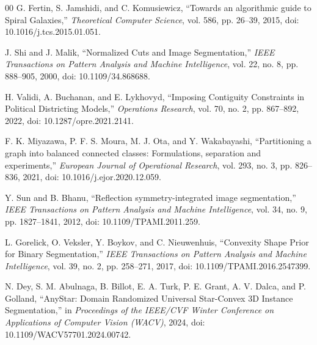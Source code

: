 \documentclass[conference]{IEEEtran}
\begin{document}
\begin{thebibliography}{00}
G. Fertin, S. Jamshidi, and C. Komusiewicz, ``Towards an algorithmic guide to Spiral Galaxies,'' \emph{Theoretical Computer Science}, vol. 586, pp. 26--39, 2015, doi: 10.1016/j.tcs.2015.01.051.

J. Shi and J. Malik, ``Normalized Cuts and Image Segmentation,'' \emph{IEEE Transactions on Pattern Analysis and Machine Intelligence}, vol. 22, no. 8, pp. 888--905, 2000, doi: 10.1109/34.868688.

H. Validi, A. Buchanan, and E. Lykhovyd, ``Imposing Contiguity Constraints in Political Districting Models,'' \emph{Operations Research}, vol. 70, no. 2, pp. 867--892, 2022, doi: 10.1287/opre.2021.2141.

F. K. Miyazawa, P. F. S. Moura, M. J. Ota, and Y. Wakabayashi, ``Partitioning a graph into balanced connected classes: Formulations, separation and experiments,'' \emph{European Journal of Operational Research}, vol. 293, no. 3, pp. 826--836, 2021, doi: 10.1016/j.ejor.2020.12.059.

Y. Sun and B. Bhanu, ``Reflection symmetry-integrated image segmentation,'' \emph{IEEE Transactions on Pattern Analysis and Machine Intelligence}, vol. 34, no. 9, pp. 1827--1841, 2012, doi: 10.1109/TPAMI.2011.259.

L. Gorelick, O. Veksler, Y. Boykov, and C. Nieuwenhuis, ``Convexity Shape Prior for Binary Segmentation,'' \emph{IEEE Transactions on Pattern Analysis and Machine Intelligence}, vol. 39, no. 2, pp. 258--271, 2017, doi: 10.1109/TPAMI.2016.2547399.

N. Dey, S. M. Abulnaga, B. Billot, E. A. Turk, P. E. Grant, A. V. Dalca, and P. Golland, ``AnyStar: Domain Randomized Universal Star-Convex 3D Instance Segmentation,'' in \emph{Proceedings of the IEEE/CVF Winter Conference on Applications of Computer Vision (WACV)}, 2024, doi: 10.1109/WACV57701.2024.00742.
\end{thebibliography}
\end{document}
